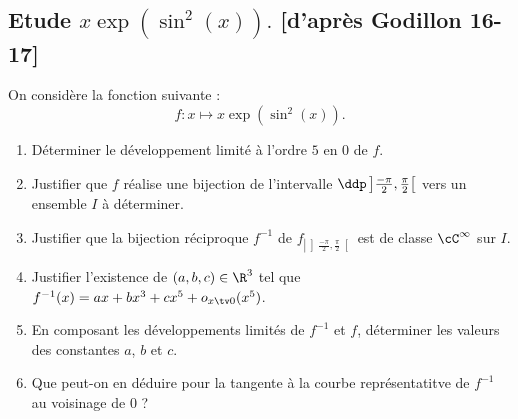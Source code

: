 \subsection{Etude $ x\exp(\sin^2(x)).$ [d'après Godillon 16-17]  }
\begin{exercice}%
On considère la fonction suivante :
$$f : x\mapsto x\exp(\sin^2(x)).$$
\begin{enumerate}
\item Déterminer le développement limité à l'ordre $5$ en $0$ de $f$. 
\item Justifier que $f$ réalise une bijection de l'intervalle $\ddp \left] \frac{-\pi}{2},\frac{\pi}{2}\right[$ vers un ensemble $I$ à déterminer. 
\item Justifier que la bijection réciproque $f^{-1}$ de $f_{\left|{\left] \frac{-\pi}{2},\frac{\pi}{2}\right[}\right.}$ est de classe $\cC^\infty$ sur $I$. 
\item Justifier l'existence de $(a,b,c) \in \R^3$ tel que $f^{-1} (x) =ax+bx^3 +cx^5 +o_{x\tv 0} (x^5)$.
\item En composant les développements limités de $f^{-1}$ et $f$, déterminer les valeurs des constantes $a$, $b$ et $c$. 
\item Que peut-on en déduire pour la tangente à la courbe représentatitve de $f^{-1}$ au voisinage de $0$ ?
\end{enumerate}
\end{exercice}

